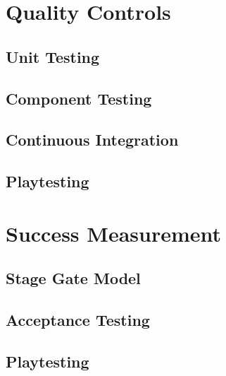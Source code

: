 \section{Quality Controls}
\label{section:quality}

\subsection{Unit Testing}

\subsection{Component Testing}

\subsection{Continuous Integration}

\subsection{Playtesting}



\section{Success Measurement}

\subsection{Stage Gate Model}

\subsection{Acceptance Testing}

\subsection{Playtesting}
